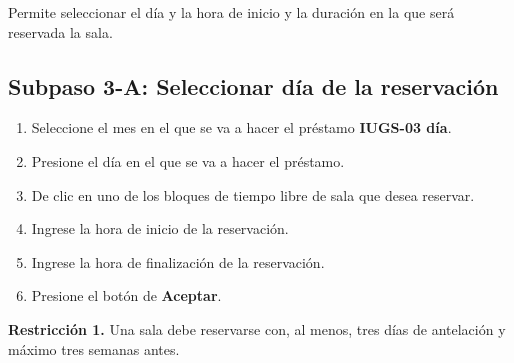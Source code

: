 Permite seleccionar el día y la hora de inicio y la duración en la que será reservada la sala.

\subsection{Subpaso 3-A: Seleccionar día de la reservación}
\begin{enumerate}
	\item Seleccione el mes en el que se va a hacer el préstamo 
		\textbf{IUGS-03 día}.
	\item Presione el día en el que se va a hacer el préstamo.
	\item De clic en uno de los bloques de tiempo libre de sala que 
		desea reservar.
	\item Ingrese la hora de inicio de la reservación.
	\item Ingrese la hora de finalización de la reservación.
	\item Presione el botón de \textbf{Aceptar}.
\end{enumerate}

\textbf{Restricción 1.} Una sala debe reservarse con, al menos, tres
	días de antelación y máximo tres semanas antes.
